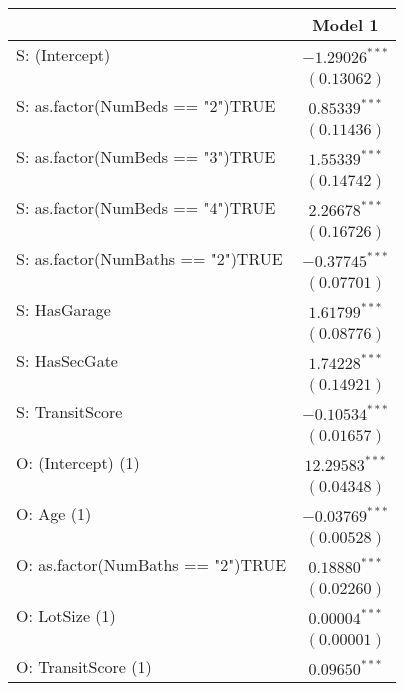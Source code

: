 
\begin{table}
\begin{center}
\begin{tiny}
\begin{tabular}{l c}
\hline
 & Model 1 \\
\hline
S: (Intercept)                    & $-1.29026^{***}$ \\
                                  & $(0.13062)$      \\
S: as.factor(NumBeds == "2")TRUE  & $0.85339^{***}$  \\
                                  & $(0.11436)$      \\
S: as.factor(NumBeds == "3")TRUE  & $1.55339^{***}$  \\
                                  & $(0.14742)$      \\
S: as.factor(NumBeds == "4")TRUE  & $2.26678^{***}$  \\
                                  & $(0.16726)$      \\
S: as.factor(NumBaths == "2")TRUE & $-0.37745^{***}$ \\
                                  & $(0.07701)$      \\
S: HasGarage                      & $1.61799^{***}$  \\
                                  & $(0.08776)$      \\
S: HasSecGate                     & $1.74228^{***}$  \\
                                  & $(0.14921)$      \\
S: TransitScore                   & $-0.10534^{***}$ \\
                                  & $(0.01657)$      \\
O: (Intercept) (1)                & $12.29583^{***}$ \\
                                  & $(0.04348)$      \\
O: Age (1)                        & $-0.03769^{***}$ \\
                                  & $(0.00528)$      \\
O: as.factor(NumBaths == "2")TRUE & $0.18880^{***}$  \\
                                  & $(0.02260)$      \\
O: LotSize (1)                    & $0.00004^{***}$  \\
                                  & $(0.00001)$      \\
O: TransitScore (1)               & $0.09650^{***}$  \\

\end{tabular}
\end{tiny}
\end{center}
\end{table}
